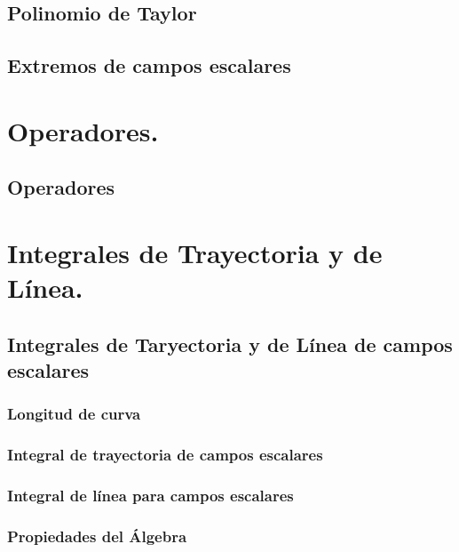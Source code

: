 \documentclass{report}
\begin{document}
  \section{Polinomio de Taylor} 
   
   
  \section{Extremos de campos escalares} 
   

 \chapter{Operadores.}
  \section{Operadores}    
  
   
  \chapter{Integrales de Trayectoria y de  L\'inea.}
                       \section{Integrales de Taryectoria y de L\'inea de campos escalares}
        \subsection{Longitud de curva} 
             
              \subsection{Integral de trayectoria de campos escalares}
                 
               \subsection{Integral de línea para campos escalares}
                 
                \subsection{Propiedades del Álgebra}
             
  
\end{document}
